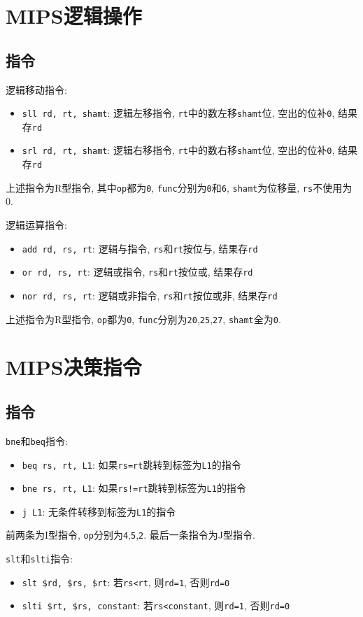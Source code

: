 \section{MIPS逻辑操作}
\subsection{指令}
逻辑移动指令:
\begin{itemize}
\item \verb|sll rd, rt, shamt|: 逻辑左移指令, \verb|rt|中的数左移\verb|shamt|位, 空出的位补\verb|0|, 结果存\verb|rd|
\item \verb|srl rd, rt, shamt|: 逻辑右移指令, \verb|rt|中的数右移\verb|shamt|位, 空出的位补\verb|0|, 结果存\verb|rd|
\end{itemize}\par
上述指令为R型指令, 其中\verb|op|都为\verb|0|, \verb|func|分别为\verb|0|和\verb|6|, \verb|shamt|为位移量, \verb|rs|不使用为0. \par
逻辑运算指令:
\begin{itemize}
\item \verb|add rd, rs, rt|: 逻辑与指令, \verb|rs|和\verb|rt|按位与, 结果存\verb|rd|
\item \verb|or rd, rs, rt|: 逻辑或指令, \verb|rs|和\verb|rt|按位或, 结果存\verb|rd|
\item \verb|nor rd, rs, rt|: 逻辑或非指令, \verb|rs|和\verb|rt|按位或非, 结果存\verb|rd|
\end{itemize}\par
上述指令为R型指令, \verb|op|都为\verb|0|, \verb|func|分别为\verb|20|,\verb|25|,\verb|27|, \verb|shamt|全为\verb|0|.
\section{MIPS决策指令}
\subsection{指令}
\verb|bne|和\verb|beq|指令:
\begin{itemize}
\item \verb|beq rs, rt, L1|: 如果\verb|rs=rt|跳转到标签为\verb|L1|的指令
\item \verb|bne rs, rt, L1|: 如果\verb|rs!=rt|跳转到标签为\verb|L1|的指令
\item \verb|j L1|: 无条件转移到标签为\verb|L1|的指令
\end{itemize}\par
前两条为I型指令, \verb|op|分别为\verb|4|,\verb|5|,\verb|2|. 最后一条指令为J型指令.\par
\verb|slt|和\verb|slti|指令:
\begin{itemize}
\item \verb|slt $rd, $rs, $rt|: 若\verb|rs<rt|, 则\verb|rd=1|, 否则\verb|rd=0|
\item \verb|slti $rt, $rs, constant|: 若\verb|rs<constant|, 则\verb|rd=1|, 否则\verb|rd=0|
\end{itemize}
